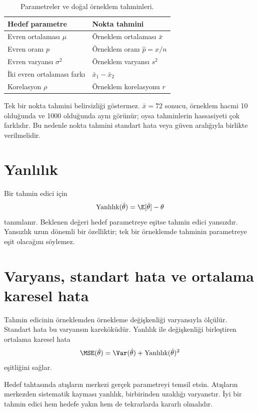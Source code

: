 \begin{table}[H]
\centering
\caption{Parametreler ve doğal örneklem tahminleri.}
\label{tab:natural-estimators}
\begin{tabular}{p{}p{}}
\toprule
Hedef parametre & Nokta tahmini \\
\midrule
Evren ortalaması $\mu$ & Örneklem ortalaması $\bar x$ \\
Evren oranı $p$ & Örneklem oranı $\hat p=x/n$ \\
Evren varyansı $\sigma^2$ & Örneklem varyansı $s^2$ \\
İki evren ortalaması farkı & $\bar x_1-\bar x_2$ \\
Korelasyon $\rho$ & Örneklem korelasyonu $r$ \\
\bottomrule
\end{tabular}
\end{table}

Tek bir nokta tahmini belirsizliği göstermez. $\bar x=72$ sonucu, örneklem
hacmi 10 olduğunda ve 1000 olduğunda aynı görünür; oysa tahminlerin hassasiyeti
çok farklıdır. Bu nedenle nokta tahmini standart hata veya güven aralığıyla
birlikte verilmelidir.

\section{Yanlılık}
\label{sec:estimator-bias}

Bir tahmin edici için
\[
\text{Yanlılık}(\hat\theta)
=\E[\hat\theta]-\theta
\]
tanımlanır. Beklenen değeri hedef parametreye eşitse tahmin edici yansızdır.
Yansızlık uzun dönemli bir özelliktir; tek bir örneklemde tahminin parametreye
eşit olacağını söylemez.

\section{Varyans, standart hata ve ortalama karesel hata}
\label{sec:estimator-mse}

Tahmin edicinin örneklemden örnekleme değişkenliği varyansıyla ölçülür.
Standart hata bu varyansın kareköküdür. Yanlılık ile değişkenliği birleştiren
ortalama karesel hata
\[
\MSE(\hat\theta)=\Var(\hat\theta)
+\text{Yanlılık}(\hat\theta)^2
\]
eşitliğini sağlar.

\begin{sezgibox}
Hedef tahtasında atışların merkezi gerçek parametreyi temsil etsin. Atışların
merkezden sistematik kayması yanlılık, birbirinden uzaklığı varyanstır. İyi bir
tahmin edici hem hedefe yakın hem de tekrarlarda kararlı olmalıdır.
\end{sezgibox}

